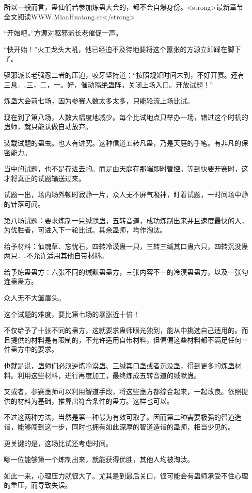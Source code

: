 \begin{this_body}
所以一般而言，蛊仙们若参加炼蛊大会的，都不会自爆身份。<strong>最新章节全文阅读WWW.MianHuatang.cc</strong>

“开始吧。”方源对驱邪派长老催促一声。

“快开始！”火工龙头大吼，他已经迫不及待地要将这个嚣张的方源立即踩在脚下了。

驱邪派长老强忍二者的压迫，咬牙坚持道：“按照规矩时间未到，不好开赛。还有三息……三，二，一。好，催动隔绝蛊阵，关闭上场入口。开放试题！”

炼蛊大会前七场，因为参赛人数太多太多，只能轮流上场比试。

现在到了第八场，人数大幅度地减少。每个比试地点只举办一场，错过这个时机的蛊师，就只能认做自动放弃。

装载试题的蛊虫。也大有讲究。这种信道五转凡蛊，乃是天庭的手笔。有非凡的保密能力。

当中的试题，也不是存进去的。而是由天庭在那端即时管控。等到快要开赛时，这才将真正的试题输送过来。

试题一出，场内场外顿时寂静一片，众人无不屏气凝神，盯着试题，一时间场中静的针落可闻。

第八场试题：要求炼制一只缄默蛊，五转音道，成功炼制出来并且速度最快的人，为优胜者，可进入下一轮比试。其余蛊师，均作淘汰。

给予材料：仙魂草、忘忧石，四转冷漠蛊一只，三转三缄其口蛊六只，四转沉没蛊两只……不允许适用其他自带材料。

给予炼蛊蛊方：六张不同的缄默蛊蛊方，三张内容不一的冷漠蛊蛊方，以及一张勾连蛊蛊方。

众人无不大皱眉头。

这个试题的难度，要比第七场的暴涨近十倍！

不仅给予了十张不同的蛊方，这就要求蛊师眼光独到，能从中挑选自己适用的。而且提供的材料是有限制的，不允许适用自带材料，但偏偏这些材料都不满足任何一件蛊方中的要求。

也就是说，蛊师们必须逆炼冷漠蛊、三缄其口蛊或者沉没蛊，得到更多的炼蛊材料。利用这些材料，进行再度加工，最终炼成五转音道的缄默蛊。

又或者，参赛蛊师可以利用智道手段，将这些蛊方都综合起来，一起改良。依照提供的材料为基础，推算出符合条件的蛊方。这样也可以。

不过这两种方法，当然是第一种最为有效可取了。因而第二种需要极强的智道造诣，能够闯到这一步，同时也拥有如此深厚的智道造诣的蛊师，相当少见的。

更关键的是，这场比试还考虑时间。

哪一位能够第一个炼制出来，就能获得优胜，其他人均被淘汰。

如此一来，心理压力就很大了。尤其是到最后关口，很可能会有蛊师承受不住心理的重压，而导致失误。


\end{this_body}
